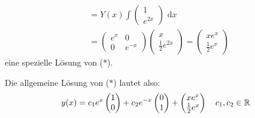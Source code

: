 \documentclass[a4paper,twoside,DIV15,BCOR12mm,chapterprefix=true,headings=twolinechapter]{scrbook}
\begin{document}
\begin{enumerate}
\begin{align*}
&= Y(x) \int \begin{pmatrix} 1 \\ e^{2x} \end{pmatrix}\text{ d}x\\ 
&=  \begin{pmatrix} e^x & 0 \\ 0 & e^{-x} \end{pmatrix} \begin{pmatrix} x \\ \frac12e^{2x} \end{pmatrix} = \begin{pmatrix} xe^x \\ \frac12e^x \end{pmatrix}
\end{align*}
eine spezielle Lösung von ($\ast$).

Die allgemeine Lösung von ($\ast$) lautet also: 
\[y(x) = c_1 e^x \begin{pmatrix} 1 \\ 0 \end{pmatrix} 
+ c_2 e^{-x} \begin{pmatrix} 0 \\ 1 \end{pmatrix}  
+ \begin{pmatrix} xe^x \\ \frac12e^x \end{pmatrix}\quad c_1, c_2 \in \mathbb{R}\]
\end{enumerate}
\end{document}
